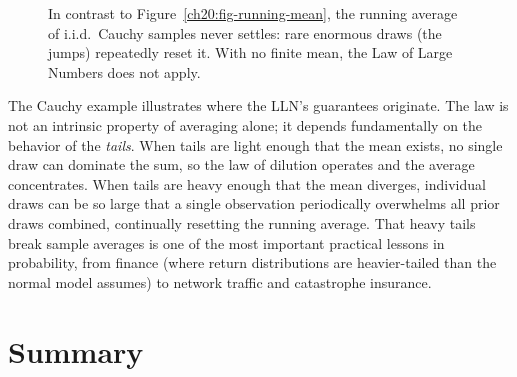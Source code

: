 \begin{figure}[H]
\centering
{}
\caption{In contrast to Figure~\ref{ch20:fig-running-mean}, the running average of i.i.d.\ Cauchy samples never settles: rare enormous draws (the jumps) repeatedly reset it. With no finite mean, the Law of Large Numbers does not apply.}
\label{ch20:fig-cauchy}
\end{figure}

\begin{happeningbox}
The Cauchy example illustrates where the LLN's guarantees originate. The law
is not an intrinsic property of averaging alone; it depends fundamentally on the
behavior of the \emph{tails}. When tails are light enough that the mean exists,
no single draw can dominate the sum, so the law of dilution operates and the
average concentrates. When tails are heavy enough that the mean diverges,
individual draws can be so large that a single observation periodically
overwhelms all prior draws combined, continually resetting the running average.
That heavy tails break sample averages is one of the most important practical
lessons in probability, from finance (where return distributions are
heavier-tailed than the normal model assumes) to network traffic and catastrophe
insurance.
\end{happeningbox}

\section{Summary}
\label{ch20:summary}

